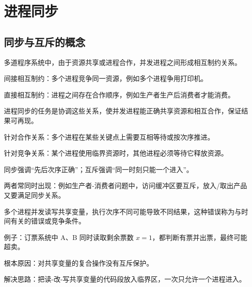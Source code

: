 \chapter{进程同步}

\section{同步与互斥的概念}
\begin{points}
  \item 多道程序系统中，由于资源共享或进程合作，并发进程之间形成相互制约关系。
  \item 间接相互制约：多个进程竞争同一资源，例如多个进程争用打印机。
  \item 直接相互制约：进程之间存在合作顺序，例如生产者生产后消费者才能消费。
  \item 进程同步的任务是协调这些关系，使并发进程能正确共享资源和相互合作，保证结果可再现。
\end{points}

\begin{points}
  \item {}针对合作关系：多个进程在某些关键点上需要互相等待或按次序推进。
  \item {}针对竞争关系：某个进程使用临界资源时，其他进程必须等待它释放资源。
  \item 同步强调“先后次序正确”；互斥强调“同一时刻只能一个进入”。
  \item 两者常同时出现：例如生产者-消费者问题中，访问缓冲区要互斥，放入/取出产品又要满足同步关系。
\end{points}


\begin{points}
  \item 多个进程并发读写共享变量，执行次序不同可能导致不同结果，这种错误称为与时间有关的错误或竞争条件。
  \item 例子：订票系统中 A、B 同时读取剩余票数 $x=1$，都判断有票并出票，最终可能超卖。
  \item 根本原因：对共享变量的复合操作没有互斥保护。
  \item 解决思路：把读-改-写共享变量的代码段放入临界区，一次只允许一个进程进入。
\end{points}


